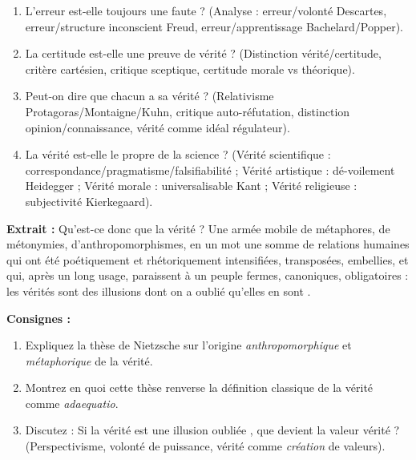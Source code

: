 \documentclass[11pt]{article}
\begin{document}
\begin{exercice}
\begin{enumerate}
    \item \guillemotleft L'erreur est-elle toujours une faute ? \guillemotright (Analyse : erreur/volonté Descartes, erreur/structure inconscient Freud, erreur/apprentissage Bachelard/Popper).
    \item \guillemotleft La certitude est-elle une preuve de vérité ? \guillemotright (Distinction vérité/certitude, critère cartésien, critique sceptique, certitude morale vs théorique).
    \item \guillemotleft Peut-on dire que \guillemotleft chacun a sa vérité \guillemotright ? \guillemotright (Relativisme Protagoras/Montaigne/Kuhn, critique auto-réfutation, distinction opinion/connaissance, vérité comme idéal régulateur).
    \item \guillemotleft La vérité est-elle le propre de la science ? \guillemotright (Vérité scientifique : correspondance/pragmatisme/falsifiabilité ; Vérité artistique : dé-voilement Heidegger ; Vérité morale : universalisable Kant ; Vérité religieuse : subjectivité Kierkegaard).
\end{enumerate}
\end{exercice}

\begin{exercice}
\textbf{Extrait :} \guillemotleft Qu'est-ce donc que la vérité ? Une armée mobile de métaphores, de métonymies, d'anthropomorphismes, en un mot une somme de relations humaines qui ont été poétiquement et rhétoriquement intensifiées, transposées, embellies, et qui, après un long usage, paraissent à un peuple fermes, canoniques, obligatoires : les vérités sont des illusions dont on a oublié qu'elles en sont \guillemotright.

\textbf{Consignes :}
\begin{enumerate}
    \item Expliquez la thèse de Nietzsche sur l'origine \emph{anthropomorphique} et \emph{métaphorique} de la vérité.
    \item Montrez en quoi cette thèse renverse la définition classique de la vérité comme \emph{adaequatio}.
    \item Discutez : Si la vérité est une \guillemotleft illusion oubliée \guillemotright, que devient la valeur \guillemotleft vérité \guillemotright ? (Perspectivisme, volonté de puissance, vérité comme \emph{création} de valeurs).
\end{enumerate}
\end{exercice}
\end{document}
